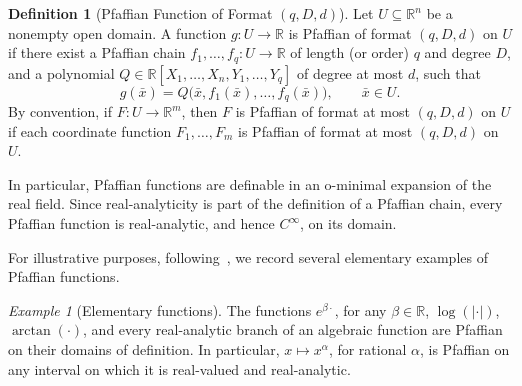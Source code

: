 \documentclass{article}
\theoremstyle{plain}
\theoremstyle{definition}
\theoremstyle{remark}
\newtheorem{example}{Example}
\newcommand{\reals}{\mathbb{R}}
\theoremstyle{plain}
\numberwithin{thm}{section}
\theoremstyle{definition}
\newtheorem{Def}[thm]{Definition}
\numberwithin{equation}{section}
\begin{document}
\begin{Def}[Pfaffian Function of Format $(q,D,d)$]
\label{defn:PfaffianFunctionFormat}
Let $U\subseteq\reals^n$ be a nonempty open domain.  A function $g:U\to\reals$ is Pfaffian of format $(q,D,d)$ on $U$ if there exist a Pfaffian chain
$
    f_1,\dots,f_q:U\to\reals
$
of length (or order) $q$ and degree $D$, and a polynomial
$
    Q\in\reals[X_1,\dots,X_n,Y_1,\dots,Y_q]
$
of degree at most $d$, such that
$$
    g(\bar{x})
    =
    Q\big(\bar{x},f_1(\bar{x}),\dots,f_q(\bar{x})\big),
    \qquad
    \bar{x}\in U .
$$
By convention, if $F:U\to\reals^m$, then $F$ is Pfaffian of format at most $(q,D,d)$ on $U$ if each coordinate function $F_1,\dots,F_m$ is Pfaffian of format at most $(q,D,d)$ on $U$.
\end{Def}

In particular, Pfaffian functions are definable in an o-minimal expansion of the real field.  Since real-analyticity is part of the definition of a Pfaffian chain, every Pfaffian function is real-analytic, and hence $C^\infty$, on its domain.


For illustrative purposes, following~\cite[Example 2.3]{GabrielovVorobjov_NoetherianPfaffianComplexity_2004}, we record several elementary examples of Pfaffian functions.

\begin{example}[Elementary functions]
\label{ex:Pfaffians}
The functions $e^{\beta \cdot}$, for any $\beta\in\reals$, $\log(|\cdot|)$, $\arctan(\cdot)$, and every real-analytic branch of an algebraic function are Pfaffian on their domains of definition.  In particular, $x\mapsto x^\alpha$, for rational $\alpha$, is Pfaffian on any interval on which it is real-valued and real-analytic.
\end{example}
\end{document}
